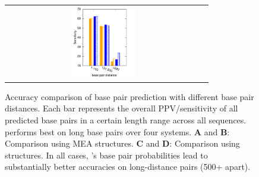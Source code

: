 \begin{figure}[h]
\begin{tabular}{cc}
\hspace{-0.35cm}\includegraphics[width=0.35\textwidth]{figs/bylen_bar_recall_hzhang_threshknot}
\end{tabular}
  \caption[.]{Accuracy comparison of base pair prediction with different base pair distances. 
  Each bar represents the overall PPV/sensitivity of all predicted 
base pairs in a certain length range across all sequences. 
\linearpartition performs best on long base pairs over four systems. 
{\bf A} and {\bf B}: Comparison using MEA structures. 
{\bf C} and {\bf D}: Comparison using \threshknot structures.
In all cases, \linearpartition's base pair probabilities lead to substantially better accuracies on long-distance pairs (500+ \nts apart).
  \label{fig:distance}}
\end{figure}



